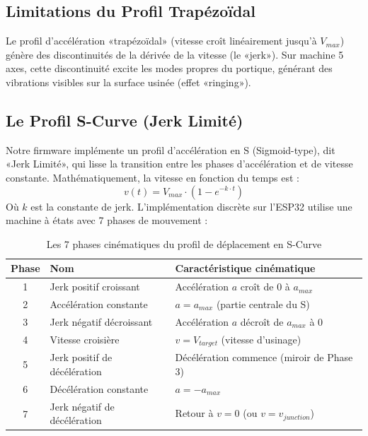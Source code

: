 \subsection{Limitations du Profil Trapézoïdal}
Le profil d'accélération «trapézoïdal» (vitesse croît linéairement jusqu'à $V_{max}$) génère des discontinuités de la dérivée de la vitesse (le «jerk»). Sur machine 5 axes, cette discontinuité excite les modes propres du portique, générant des vibrations visibles sur la surface usinée (effet «ringing»).

\subsection{Le Profil S-Curve (Jerk Limité)}
Notre firmware implémente un profil d'accélération en S (Sigmoid-type), dit «Jerk Limité», qui lisse la transition entre les phases d'accélération et de vitesse constante. Mathématiquement, la vitesse en fonction du temps est :
\begin{equation}
    v(t) = V_{max} \cdot \left(1 - e^{-k \cdot t}\right)
\end{equation}
Où $k$ est la constante de jerk. L'implémentation discrète sur l'ESP32 utilise une machine à états avec 7 phases de mouvement :

\begin{table}[htbp]
\centering
\renewcommand{\arraystretch}{1.3}
\begin{tabular}{|c|l|l|}
\hline
\rowcolor{macouleur!20}
\textbf{Phase} & \textbf{Nom} & \textbf{Caractéristique cinématique} \\
\hline
1 & Jerk positif croissant & Accélération $a$ croît de $0$ à $a_{max}$ \\
\hline
2 & Accélération constante & $a = a_{max}$ (partie centrale du S) \\
\hline
3 & Jerk négatif décroissant & Accélération $a$ décroît de $a_{max}$ à $0$ \\
\hline
4 & Vitesse croisière & $v = V_{target}$ (vitesse d'usinage) \\
\hline
5 & Jerk positif de décélération & Décélération commence (miroir de Phase 3) \\
\hline
6 & Décélération constante & $a = -a_{max}$ \\
\hline
7 & Jerk négatif de décélération & Retour à $v = 0$ (ou $v = v_{junction}$) \\
\hline
\end{tabular}
\caption{Les 7 phases cinématiques du profil de déplacement en S-Curve}
\label{tab:s_curve_phases}
\end{table}

